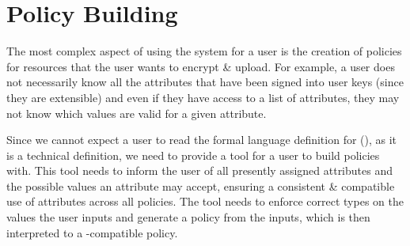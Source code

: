 \section{Policy Building}
\label{sec:design_pol_build}

The most complex aspect of using the \theResServer system for a user is the creation of policies for resources that the user wants to encrypt \& upload. For example, a user does not necessarily know all the attributes that have been signed into user keys (since they are extensible) and even if they have access to a list of attributes, they may not know which values are valid for a given attribute.

Since we cannot expect a user to read the formal language definition for \thePolicyLang (), as it is a technical definition, we need to provide a tool for a user to build policies with. This tool needs to inform the user of all presently assigned attributes and the possible values an attribute may accept, ensuring a consistent \& compatible use of attributes across all policies. The tool needs to enforce correct types on the values the user inputs and generate a \thePolicyLang policy from the inputs, which is then interpreted to a \PyOpenABE-compatible policy.


